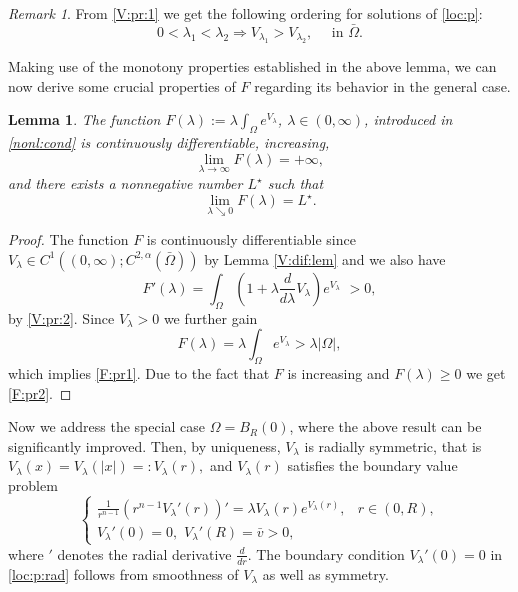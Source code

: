 \documentclass[12pt,a4paper]{amsart}
\newtheorem{lemma}[theorem]{Lemma}
\theoremstyle{definition}
\theoremstyle{remark}
\newtheorem{remark}[theorem]{Remark}
\numberwithin{equation}{section}
\numberwithin{theorem}{section}
\begin{document}
\begin{remark}
From \eqref{V:pr:1} we get the following ordering for solutions of \eqref{loc:p}:
\begin{equation}\label{pr3}
0<\lambda_1<\lambda_2\Rightarrow V_{\lambda_1}> V_{\lambda_2},\quad \text{ in }\bar{\Omega}.
\end{equation} 
\end{remark}

Making use of the monotony properties established in the above lemma, we can now derive some crucial properties of $F$ regarding its behavior in the general case. 

\begin{lemma}\label{limF}
The function $F(\lambda) := \lambda \int_\Omega e^{V_\lambda}$, $\lambda \in (0,\infty)$, introduced in \eqref{nonl:cond} is continuously differentiable, increasing,
\begin{equation}\label{F:pr1}
\lim_{\lambda\rightarrow\infty}F(\lambda)=+\infty,
\end{equation}
and there exists a nonnegative number $L^\star$ such that 
\begin{equation}\label{F:pr2}
\lim_{\lambda\searrow 0}F(\lambda)=L^\star.
\end{equation}

\end{lemma}
\begin{proof} 
The function $F$ is continuously differentiable since $V_\lambda\in C^1((0,\infty);C^{2,\alpha}(\bar{\Omega}))$ by Lemma \ref{V:dif:lem} and we also have 
$$F'(\lambda)=\int_\Omega \left(1+\lambda \frac{d}{d\lambda}
V_\lambda\right)e^{V_\lambda}\,\,>0,$$
by \eqref{V:pr:2}.
Since $V_\lambda>0$ we further gain
$$
F(\lambda)=\lambda\int_\Omega e^{V_\lambda}> \lambda |\Omega|,
$$
which implies \eqref{F:pr1}. Due to the fact that $F$ is increasing and $F(\lambda)\geq 0$ we get \eqref{F:pr2}.




\end{proof}

Now we address the special case $\Omega=B_R(0)$, where the above result can be significantly improved. Then, by uniqueness, $V_\lambda$ is radially symmetric, that is $V_\lambda(x)=V_\lambda(|x|)=:V_\lambda(r),$ and $V_\lambda(r)$ satisfies the boundary value problem
\begin{equation}\label{loc:p:rad}
\left\{\begin{array}{lr}
\frac{1}{r^{n-1}}(r^{n-1}V_\lambda'(r))'=\lambda V_\lambda(r) e^{V_\lambda(r)},& r\in(0,R),\\
V_\lambda '(0)=0,\,\, V_\lambda '(R)=\bar{v}>0,&  
\end{array}\right.
\end{equation}
where $'$ denotes the radial derivative $\frac{d}{d r}$. The boundary condition $V_\lambda '(0)=0$ in \eqref{loc:p:rad} follows from smoothness of $V_\lambda$ as well as symmetry. 
\end{document}

